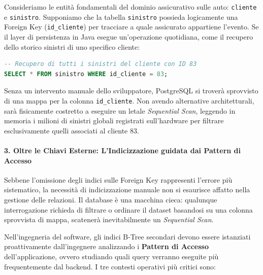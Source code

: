 \begin{example}
Consideriamo le entità fondamentali del dominio assicurativo sulle auto: \texttt{cliente} e \texttt{sinistro}. Supponiamo che la tabella \texttt{sinistro} possieda logicamente una Foreign Key (\texttt{id\_cliente}) per tracciare a quale assicurato appartiene l'evento.
Se il layer di persistenza in Java esegue un'operazione quotidiana, come il recupero dello storico sinistri di uno specifico cliente:
\begin{lstlisting}[language=SQL, basicstyle=\ttfamily\small, keywordstyle=\color{blue}\bfseries]
-- Recupero di tutti i sinistri del cliente con ID 83
SELECT * FROM sinistro WHERE id_cliente = 83;
\end{lstlisting}
Senza un intervento manuale dello sviluppatore, PostgreSQL si troverà sprovvisto di una mappa per la colonna \texttt{id\_cliente}. Non avendo alternative architetturali, sarà fisicamente costretto a eseguire un letale \textit{Sequential Scan}, leggendo in memoria i milioni di sinistri globali registrati sull'hardware per filtrare esclusivamente quelli associati al cliente 83.
\end{example}

\paragraph{3. Oltre le Chiavi Esterne: L'Indicizzazione guidata dai Pattern di Accesso}

Sebbene l'omissione degli indici sulle Foreign Key rappresenti l'errore più sistematico, la necessità di indicizzazione manuale non si esaurisce affatto nella gestione delle relazioni. Il database è una macchina cieca: qualunque interrogazione richieda di filtrare o ordinare il dataset basandosi su una colonna sprovvista di mappa, scatenerà inevitabilmente un \textit{Sequential Scan}.

Nell'ingegneria del software, gli indici B-Tree secondari devono essere istanziati proattivamente dall'ingegnere analizzando i \textbf{Pattern di Accesso} dell'applicazione, ovvero studiando quali query verranno eseguite più frequentemente dal backend. I tre contesti operativi più critici sono:

